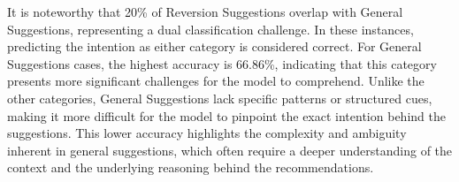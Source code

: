 

It is noteworthy that 20\% of Reversion Suggestions overlap with General Suggestions, representing a dual classification challenge. In these instances, predicting the intention as either category is considered correct. 
For General Suggestions cases, the highest accuracy is 66.86\%, indicating that this category presents more significant challenges for the model to comprehend. Unlike the other categories, General Suggestions lack specific patterns or structured cues, making it more difficult for the model to pinpoint the exact intention behind the suggestions. This lower accuracy highlights the complexity and ambiguity inherent in general suggestions, which often require a deeper understanding of the context and the underlying reasoning behind the recommendations.












